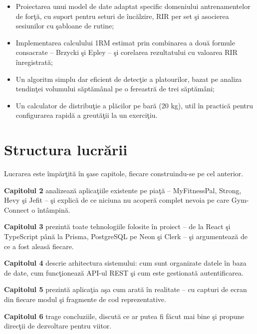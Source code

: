 \begin{itemize}
  \item Proiectarea unui model de date adaptat specific domeniului
        antrenamentelor de for\c t\u a, cu suport pentru seturi de
        \^ inc\u alzire, RIR per set \c si asocierea sesiunilor cu
        \c sabloane de rutine;
  \item Implementarea calculului 1RM estimat prin combinarea a dou\u a
        formule consacrate -- Brzycki \cite{brzycki1993strength} \c si
        Epley \cite{epley1985} -- \c si corelarea rezultatului cu
        valoarea RIR \^ inregistrat\u a;
  \item Un algoritm simplu dar eficient de detec\c tie a platourilor,
        bazat pe analiza tendin\c tei volumului s\u apt\u am\^ anal pe
        o fereastr\u a de trei s\u apt\u am\^ ani;
  \item Un calculator de distribu\c tie a pl\u acilor pe bar\u a
        (20 kg), util \^ in practic\u a pentru configurarea rapid\u a
        a greut\u a\c tii la un exerci\c tiu.
\end{itemize}

\section{Structura lucr\u arii}

Lucrarea este \^ imp\u ar\c tit\u a \^ in \c sase capitole, fiecare
construindu-se pe cel anterior.

\textbf{Capitolul 2} analizeaz\u a aplica\c tiile existente pe pia\c t\u a --
MyFitnessPal, Strong, Hevy \c si Jefit -- \c si explic\u a de ce
niciuna nu acoper\u a complet nevoia pe care Gym-Connect o
\^ int\^ ampin\u a.

\textbf{Capitolul 3} prezint\u a toate tehnologiile folosite \^ in
proiect -- de la React \c si TypeScript p\^ an\u a la Prisma,
PostgreSQL pe Neon \c si Clerk -- \c si argumenteaz\u a de ce a
fost aleas\u a fiecare.

\textbf{Capitolul 4} descrie arhitectura sistemului: cum
sunt organizate datele \^ in baza de date, cum func\c tioneaz\u a
API-ul REST \c si cum este gestionat\u a autentificarea.

\textbf{Capitolul 5} prezint\u a aplica\c tia a\c sa cum arat\u a
\^ in realitate -- cu capturi de ecran din fiecare modul \c si
fragmente de cod reprezentative.

\textbf{Capitolul 6} trage concluziile, discut\u a ce ar putea
fi f\u acut mai bine \c si propune direc\c tii de dezvoltare
pentru viitor.
